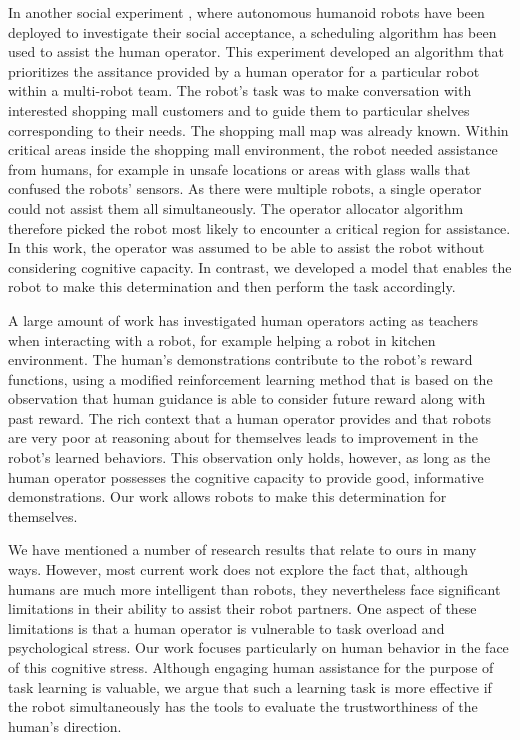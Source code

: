 \documentclass{sig-alternate}
\begin{document}
In another social experiment \cite{zheng2013supervisory}, where
autonomous humanoid robots have been deployed to investigate their
social acceptance, a scheduling algorithm has been used to assist the
human operator.  This experiment developed an algorithm that
prioritizes the assitance provided by a human operator for a
particular robot within a multi-robot team. The robot's task was to
make conversation with interested shopping mall customers and to guide
them to particular shelves corresponding to their needs. The shopping
mall map was already known.  Within critical areas inside the shopping
mall environment, the robot needed assistance from humans, for example
in unsafe locations or areas with glass walls that confused the
robots' sensors.  As there were multiple robots, a single operator
could not assist them all simultaneously.  The operator allocator
algorithm therefore picked the robot most likely to encounter a
critical region for assistance. In this work, the operator was assumed
to be able to assist the robot without considering cognitive
capacity. In contrast, we developed a model that enables the robot to
make this determination and then perform the task accordingly.

A large amount of work
\cite{thomaz2006reinforcement,thomaz2008teachable} has investigated
human operators acting as teachers when interacting with a robot, for
example helping a robot in kitchen environment. The human's
demonstrations contribute to the robot's reward functions, using a
modified reinforcement learning method that is based on the
observation that human guidance is able to consider future reward
along with past reward.  The rich context that a human operator
provides and that robots are very poor at reasoning about for
themselves leads to improvement in the robot's learned behaviors.
This observation only holds, however, as long as the human operator
possesses the cognitive capacity to provide good, informative
demonstrations.  Our work allows robots to make this determination for
themselves.

We have mentioned a number of research results that relate to ours in
many ways.  However, most current work does not explore the fact that,
although humans are much more intelligent than robots, they
nevertheless face significant limitations in their ability to assist
their robot partners.  One aspect of these limitations is that a human
operator is vulnerable to task overload and psychological stress.  Our
work focuses particularly on human behavior in the face of this
cognitive stress.  Although engaging human assistance for the purpose
of task learning is valuable, we argue that such a learning task is
more effective if the robot simultaneously has the tools to evaluate
the trustworthiness of the human's direction.
\end{document}
